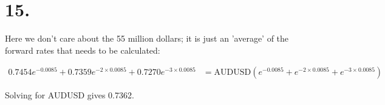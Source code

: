 \documentclass[paper=a4, fontsize=11pt]{scrartcl} %
\numberwithin{equation}{section} %
\numberwithin{figure}{section} %
\numberwithin{table}{section} %
\begin{document}
\section*{15.}

Here we don't care about the 55 million dollars; it is just an 'average' of the forward rates that needs to be calculated:

\begin{align*}
0.7454e^{-0.0085} + 0.7359e^{-2\times0.0085} + 0.7270e^{-3\times0.0085} &= \text{AUDUSD}(e^{-0.0085}+e^{-2\times0.0085}+e^{-3\times0.0085})
\end{align*}

Solving for AUDUSD gives 0.7362.

\end{document}
